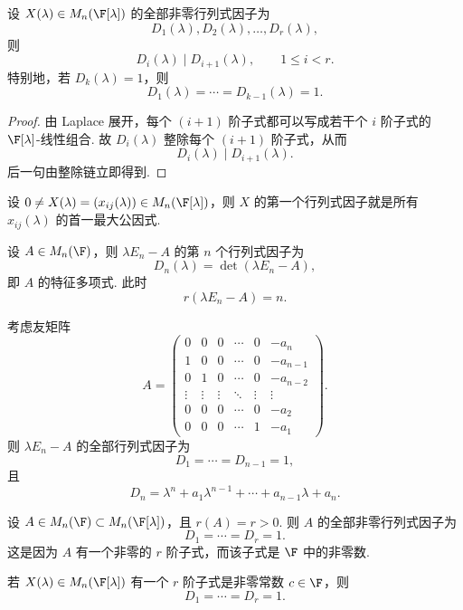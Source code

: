 \begin{corollary}
		设 $X(\lambda)\in M_n(\F[\lambda])$ 的全部非零行列式因子为
	\[
	D_1(\lambda),D_2(\lambda),\ldots,D_r(\lambda),
	\]
	则
	\[
	D_i(\lambda)\mid D_{i+1}(\lambda),\qquad 1\leq i<r.
	\]
	特别地，若 $D_k(\lambda)=1$，则
	\[
	D_1(\lambda)=\cdots=D_{k-1}(\lambda)=1.
	\]
\end{corollary}


\begin{proof}
	由 Laplace 展开，每个 $(i+1)$ 阶子式都可以写成若干个 $i$ 阶子式的 $\F[\lambda]$-线性组合.
	故 $D_i(\lambda)$ 整除每个 $(i+1)$ 阶子式，从而
	\[
	D_i(\lambda)\mid D_{i+1}(\lambda).
	\]
	后一句由整除链立即得到.
\end{proof}

\begin{example}
	设 $0\neq X(\lambda)=(x_{ij}(\lambda))\in M_n(\F[\lambda])$，则 $X$ 的第一个行列式因子就是所有 $x_{ij}(\lambda)$ 的首一最大公因式.
\end{example}

\begin{example}
	设 $A\in M_n(\F)$，则 $\lambda E_n-A$ 的第 $n$ 个行列式因子为
	\[
	D_n(\lambda)=\det(\lambda E_n-A),
	\]
	即 $A$ 的特征多项式. 此时
	\[
	r(\lambda E_n-A)=n.
	\]
\end{example}

\begin{example}
	考虑友矩阵
	\[
	A=\begin{pmatrix}
		0&0&0&\cdots&0&-a_n\\
		1&0&0&\cdots&0&-a_{n-1}\\
		0&1&0&\cdots&0&-a_{n-2}\\
		\vdots&\vdots&\vdots&\ddots&\vdots&\vdots\\
		0&0&0&\cdots&0&-a_2\\
		0&0&0&\cdots&1&-a_1
	\end{pmatrix}.
	\]
	则 $\lambda E_n-A$ 的全部行列式因子为
	\[
	D_1=\cdots=D_{n-1}=1,
	\]
	且
	\[
	D_n=\lambda^n+a_1\lambda^{n-1}+\cdots+a_{n-1}\lambda+a_n.
	\]
\end{example}

\begin{example}
	设 $A\in M_n(\F)\subset M_n(\F[\lambda])$，且 $r(A)=r>0$. 则 $A$ 的全部非零行列式因子为
	\[
	D_1=\cdots=D_r=1.
	\]
	这是因为 $A$ 有一个非零的 $r$ 阶子式，而该子式是 $\F$ 中的非零数.
\end{example}

\begin{example}
	若 $X(\lambda)\in M_n(\F[\lambda])$ 有一个 $r$ 阶子式是非零常数 $c\in\F$，则
	\[
	D_1=\cdots=D_r=1.
	\]
\end{example}

